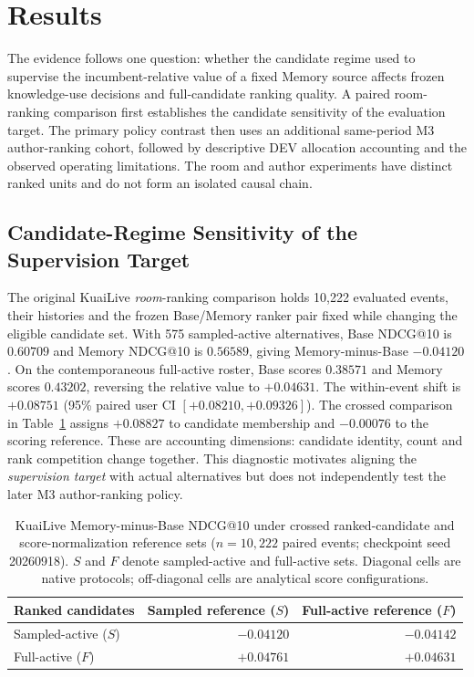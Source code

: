 \documentclass[preprint,12pt]{elsarticle}
\begin{document}
\section{Results}
\label{sec:results}

The evidence follows one question: whether the candidate regime used to supervise the incumbent-relative value of a fixed Memory source affects frozen knowledge-use decisions and full-candidate ranking quality. A paired room-ranking comparison first establishes the candidate sensitivity of the evaluation target. The primary policy contrast then uses an additional same-period M3 author-ranking cohort, followed by descriptive DEV allocation accounting and the observed operating limitations. The room and author experiments have distinct ranked units and do not form an isolated causal chain.

\subsection{Candidate-Regime Sensitivity of the Supervision Target}
\label{sec:results-regimes}

The original KuaiLive \emph{room}-ranking comparison holds 10,222 evaluated events, their histories and the frozen Base/Memory ranker pair fixed while changing the eligible candidate set. With 575 sampled-active alternatives, Base NDCG@10 is $0.60709$ and Memory NDCG@10 is $0.56589$, giving Memory-minus-Base $-0.04120$. On the contemporaneous full-active roster, Base scores $0.38571$ and Memory scores $0.43202$, reversing the relative value to $+0.04631$. The within-event shift is $+0.08751$ (95\% paired user CI $[+0.08210,+0.09326]$). The crossed comparison in Table~\ref{tab:results-factorial} assigns $+0.08827$ to candidate membership and $-0.00076$ to the scoring reference. These are accounting dimensions: candidate identity, count and rank competition change together. This diagnostic motivates aligning the \emph{supervision target} with actual alternatives but does not independently test the later M3 author-ranking policy.

\begin{table}[!htbp]
\centering
\caption{KuaiLive Memory-minus-Base NDCG@10 under crossed ranked-candidate and score-normalization reference sets ($n=10{,}222$ paired events; checkpoint seed 20260918). $S$ and $F$ denote sampled-active and full-active sets. Diagonal cells are native protocols; off-diagonal cells are analytical score configurations.}
\label{tab:results-factorial}
\footnotesize
\setlength{\tabcolsep}{6pt}
\begin{tabular}{@{}lrr@{}}
\toprule
Ranked candidates & Sampled reference ($S$) & Full-active reference ($F$) \\
\midrule
Sampled-active ($S$) & $-0.04120$ & $-0.04142$ \\
Full-active ($F$) & $+0.04761$ & $+0.04631$ \\
\bottomrule
\end{tabular}
\end{table}
\end{document}
